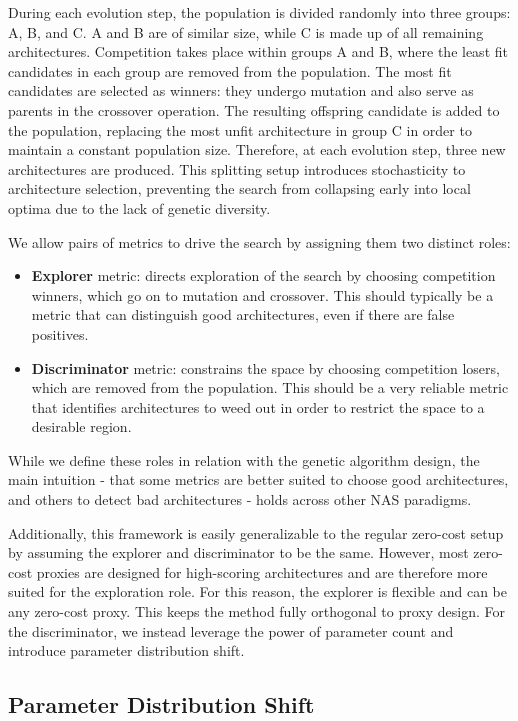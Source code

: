 \documentclass[10pt]{article} %
\begin{document}
During each evolution step, the population is divided randomly into three groups: A, B, and C. A and B are of similar size, while C is made up of all remaining architectures. Competition takes place within groups A and B, where the least fit candidates in each group are removed from the population. The most fit candidates are selected as winners: they undergo mutation and also serve as parents in the crossover operation. The resulting offspring candidate is added to the population, replacing the most unfit architecture in group C in order to maintain a constant population size. Therefore, at each evolution step, three new architectures are produced. This splitting setup introduces stochasticity to architecture selection, preventing the search from collapsing early into local optima due to the lack of genetic diversity.

We allow pairs of metrics to drive the search by assigning them two distinct roles:
\begin{itemize}
\item \textbf{Explorer} metric: directs exploration of the search by choosing competition winners, which go on to mutation and crossover. This should typically be a metric that can distinguish good architectures, even if there are false positives.

\item \textbf{Discriminator} metric: constrains the space by choosing competition losers, which are removed from the population. This should be a very reliable metric that identifies architectures to weed out in order to restrict the space to a desirable region.
\end{itemize}

While we define these roles in relation with the genetic algorithm design, the main intuition - that some metrics are better suited to choose good architectures, and others to detect bad architectures - holds across other NAS paradigms. 

Additionally, this framework is easily generalizable to the regular zero-cost setup by assuming the explorer and discriminator to be the same. However, most zero-cost proxies are designed for high-scoring architectures and are therefore more suited for the exploration role. For this reason, the explorer is flexible and can be any zero-cost proxy. This keeps the method fully orthogonal to proxy design. For the discriminator, we instead leverage the power of parameter count and introduce parameter distribution shift.

\subsection{Parameter Distribution Shift}
\label{method_parameter}
\end{document}
